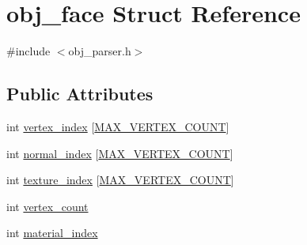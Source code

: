 \hypertarget{structobj__face}{\section{obj\+\_\+face Struct Reference}
\label{structobj__face}
}


{\ttfamily \#include $<$obj\+\_\+parser.\+h$>$}

\subsection*{Public Attributes}
\begin{DoxyCompactItemize}
\item 
int \hyperlink{structobj__face_a507982facfb73bcd3143d962e8aba781}{vertex\+\_\+index} \mbox{[}\hyperlink{obj__parser_8h_acbf8be5cb832d11ce1584c3024d2a569}{M\+A\+X\+\_\+\+V\+E\+R\+T\+E\+X\+\_\+\+C\+O\+U\+N\+T}\mbox{]}
\item 
int \hyperlink{structobj__face_aa37ed96ceb21dde7ca0e07436f0c60bd}{normal\+\_\+index} \mbox{[}\hyperlink{obj__parser_8h_acbf8be5cb832d11ce1584c3024d2a569}{M\+A\+X\+\_\+\+V\+E\+R\+T\+E\+X\+\_\+\+C\+O\+U\+N\+T}\mbox{]}
\item 
int \hyperlink{structobj__face_affde6e39f099c5f3497c3691ea66608c}{texture\+\_\+index} \mbox{[}\hyperlink{obj__parser_8h_acbf8be5cb832d11ce1584c3024d2a569}{M\+A\+X\+\_\+\+V\+E\+R\+T\+E\+X\+\_\+\+C\+O\+U\+N\+T}\mbox{]}
\item 
int \hyperlink{structobj__face_ac1a658f759cfb36b241a013cce1a8744}{vertex\+\_\+count}
\item 
int \hyperlink{structobj__face_ab354e6f87c96bd040a9cd6d4c4532f6b}{material\+\_\+index}
\end{DoxyCompactItemize}


